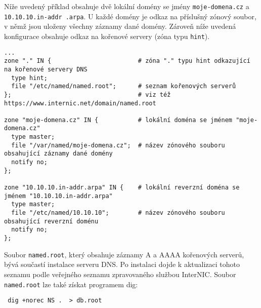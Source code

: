 Níže uvedený příklad obsahuje dvě lokální domény se jmény {\tt moje-domena.cz} a {\tt 10.10.10.in-addr .arpa}. U každé domény je odkaz na příslušný zónový soubor, v němž jsou uloženy všechny záznamy dané domény. Zároveň níže uvedená konfigurace obsahuje odkaz na kořenové servery (zóna typu {\tt hint}). 
{\footnotesize
\begin{verbatim}
...
zone "." IN {                        # zóna "." typu hint odkazující na kořenové servery DNS
  type hint;
  file "/etc/named/named.root";      # seznam kořenových serverů
};                                   # viz též https://www.internic.net/domain/named.root

zone "moje-domena.cz" IN {           # lokální doména se jménem "moje-domena.cz"
  type master;
  file "/var/named/moje-domena.cz";  # název zónového souboru obsahující záznamy dané domény
  notify no;
};

zone "10.10.10.in-addr.arpa" IN {    # lokální reverzní doména se jménem "10.10.10.in-addr.arpa"
  type master;
  file "/etc/named/10.10.10";        # název zónového souboru obsahující reverzní doménu
  notify no;
};

\end{verbatim}
}
%
%
%
Soubor {\tt named.root}, který obsahuje záznamy A a AAAA kořenových serverů, bývá součastí instalace serveru DNS. Po instalaci dojde k aktualizaci tohoto seznamu podle veřejného seznamu zpravovaného službou InterNIC. Soubor {\tt named.root} lze také získat programem dig:
\begin{verbatim}
 dig +norec NS .  > db.root
\end{verbatim}

